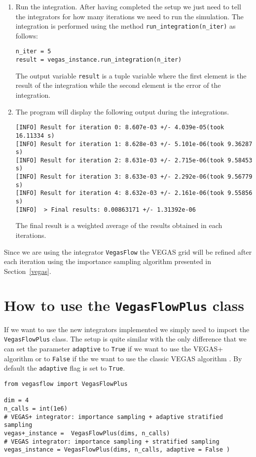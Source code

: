 \documentclass[../main/main.tex]{subfiles}
\begin{document}
\begin{enumerate}
\item Run the integration. After having completed the setup we just need to tell the integrators for how many iterations we need to run the simulation. The integration is performed using the method \texttt{run\_integration(n\_iter)} as follows:
\begin{verbatim}
n_iter = 5
result = vegas_instance.run_integration(n_iter)
\end{verbatim}
The output variable \texttt{result} is a tuple variable where the first element is the result of the integration while the second element is the error of the integration.
\item The program will display the following output during the integrations.
\begin{verbatim}
[INFO] Result for iteration 0: 8.607e-03 +/- 4.039e-05(took 16.11334 s)
[INFO] Result for iteration 1: 8.628e-03 +/- 5.101e-06(took 9.36287 s)
[INFO] Result for iteration 2: 8.631e-03 +/- 2.715e-06(took 9.58453 s)
[INFO] Result for iteration 3: 8.633e-03 +/- 2.292e-06(took 9.56779 s)
[INFO] Result for iteration 4: 8.632e-03 +/- 2.161e-06(took 9.55856 s)
[INFO]  > Final results: 0.00863171 +/- 1.31392e-06
\end{verbatim}
The final result is a weighted average of the results obtained in each iterations.
\end{enumerate}

Since we are using the integrator \texttt{VegasFlow} the VEGAS grid will be refined after each iteration using the importance sampling algorithm presented in Section~\ref{vegas}.

\section{How to use the \texttt{VegasFlowPlus} class}
If we want to use the new integrators implemented we simply need to import the \texttt{VegasFlowPlus} class. The setup is quite similar with the only difference that we can set the parameter \texttt{adaptive} to \texttt{True} if we want to use the VEGAS+ algorithm \cite{Lepage:2020tgj} or to \texttt{False} if the we want to use the classic VEGAS algorithm \cite{Lepage:1977sw}. By default the \texttt{adaptive} flag is set to \texttt{True}.


\begin{verbatim}
from vegasflow import VegasFlowPlus
		
dim = 4
n_calls = int(1e6)
# VEGAS+ integrator: importance sampling + adaptive stratified sampling
vegas+_instance =  VegasFlowPlus(dims, n_calls)
# VEGAS integrator: importance sampling + stratified sampling
vegas_instance = VegasFlowPlus(dims, n_calls, adaptive = False )
\end{verbatim}
\end{document}

